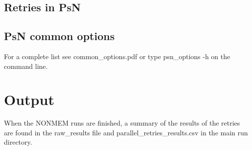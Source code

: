 \subsection{Retries in PsN}


\subsection{PsN common options}
For a complete list see common\_options.pdf or type psn\_options -h on the command line.

\section{Output}
When the NONMEM runs are finished, a summary of the results of the retries are found in the raw\_results file and parallel\_retries\_results.csv in the main run directory.


